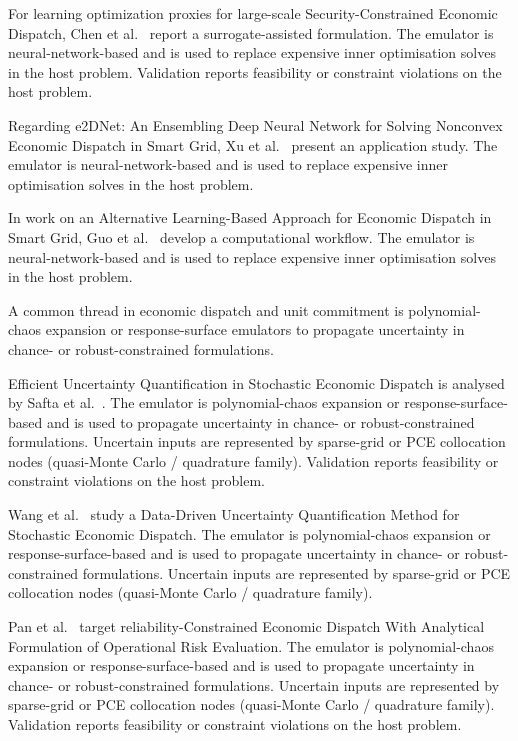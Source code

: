 For learning optimization proxies for large-scale Security-Constrained Economic Dispatch, Chen et al.~\cite{Chen2022} report a surrogate-assisted formulation. The emulator is neural-network-based and is used to replace expensive inner optimisation solves in the host problem. Validation reports feasibility or constraint violations on the host problem.

Regarding e2DNet: An Ensembling Deep Neural Network for Solving Nonconvex Economic Dispatch in Smart Grid, Xu et al.~\cite{Xu20223066} present an application study. The emulator is neural-network-based and is used to replace expensive inner optimisation solves in the host problem.

In work on an Alternative Learning-Based Approach for Economic Dispatch in Smart Grid, Guo et al.~\cite{Guo202115024} develop a computational workflow. The emulator is neural-network-based and is used to replace expensive inner optimisation solves in the host problem.

A common thread in economic dispatch and unit commitment is polynomial-chaos expansion or response-surface emulators to propagate uncertainty in chance- or robust-constrained formulations.

Efficient Uncertainty Quantification in Stochastic Economic Dispatch is analysed by Safta et al.~\cite{Safta20172535}. The emulator is polynomial-chaos expansion or response-surface-based and is used to propagate uncertainty in chance- or robust-constrained formulations. Uncertain inputs are represented by sparse-grid or PCE collocation nodes (quasi-Monte Carlo / quadrature family). Validation reports feasibility or constraint violations on the host problem.

Wang et al.~\cite{Wang2022812} study a Data-Driven Uncertainty Quantification Method for Stochastic Economic Dispatch. The emulator is polynomial-chaos expansion or response-surface-based and is used to propagate uncertainty in chance- or robust-constrained formulations. Uncertain inputs are represented by sparse-grid or PCE collocation nodes (quasi-Monte Carlo / quadrature family).

Pan et al.~\cite{Pan20244422} target reliability-Constrained Economic Dispatch With Analytical Formulation of Operational Risk Evaluation. The emulator is polynomial-chaos expansion or response-surface-based and is used to propagate uncertainty in chance- or robust-constrained formulations. Uncertain inputs are represented by sparse-grid or PCE collocation nodes (quasi-Monte Carlo / quadrature family). Validation reports feasibility or constraint violations on the host problem.

